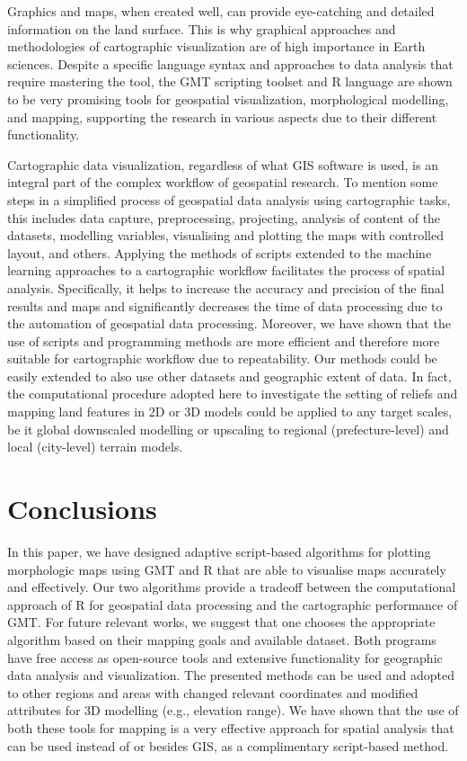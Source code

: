\documentclass[land,article,accept,pdftex,moreauthors]{Definitions/mdpi}
\begin{document}
Graphics and maps, when created well, can provide eye-catching and detailed information on the land surface. This is why graphical approaches and methodologies of cartographic visualization are of high importance in Earth sciences. Despite a specific language syntax and approaches to data analysis that require mastering the tool, the GMT scripting toolset and R language are shown to be very promising tools for geospatial visualization, morphological modelling, and mapping, supporting the research in various aspects due to their different functionality. 

Cartographic data visualization, regardless of what GIS software is used, is an integral part of the complex workflow of geospatial research. To mention some steps in a simplified process of geospatial data analysis using cartographic tasks, this includes data capture, preprocessing, projecting, analysis of content of the datasets, modelling variables, visualising and plotting the maps with controlled layout, and others. Applying the methods of scripts extended to the machine learning approaches to a cartographic workflow facilitates the process of spatial analysis. Specifically, it helps to increase the accuracy and precision of the final results and maps and significantly decreases the time of data processing due to the automation of geospatial data processing. Moreover, we {have} shown that the use of scripts and programming methods are more efficient and therefore more suitable for cartographic workflow due to repeatability. Our methods could be easily extended to also use other datasets and geographic extent of data. In fact, the computational procedure adopted here to investigate the setting of reliefs and mapping land features in 2D or 3D models could be applied to any target scales, be it global downscaled modelling or upscaling to regional (prefecture-level) and local (city-level)  terrain models. 


\section{Conclusions}

In this paper, we have designed adaptive script-based algorithms for plotting morphologic maps using GMT and R that are able to visualise maps accurately and effectively. {Our two algorithms provide a tradeoff between the computational approach of R for geospatial data processing and the cartographic performance of GMT. For future relevant works, we suggest that one chooses the appropriate algorithm based on their mapping goals and available dataset. Both programs have free access as open-source tools and extensive functionality for geographic data analysis and visualization.} The presented methods can be used and adopted to other regions and areas with changed relevant coordinates and modified attributes for 3D modelling (e.g., elevation range). We {have} shown that the use of both these tools for mapping is a very effective approach for spatial analysis that can be used instead of or besides GIS, as a complimentary script-based method. 
\end{document}
